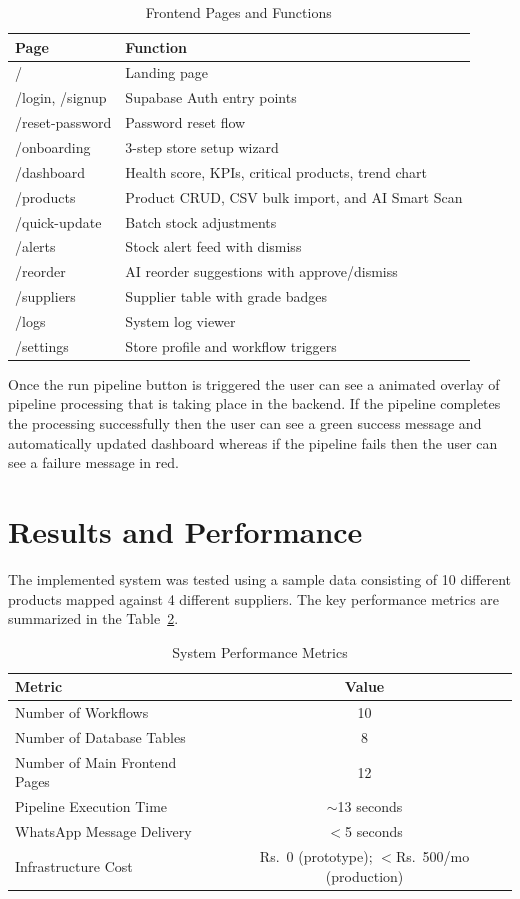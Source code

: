 \documentclass[journal]{IEEEtran}
\begin{document}
\begin{table}[htbp]
\centering
\caption{Frontend Pages and Functions}
\label{tab:routes}
\begin{tabular}{p{2.2cm}p{5.5cm}}
\toprule
\textbf{Page} & \textbf{Function} \\
\midrule
/ & Landing page \\
/login, /signup & Supabase Auth entry points \\
/reset-password & Password reset flow \\
/onboarding & 3-step store setup wizard \\
/dashboard & Health score, KPIs, critical products, trend chart \\
/products & Product CRUD, CSV bulk import, and AI Smart Scan \\
/quick-update & Batch stock adjustments \\
/alerts & Stock alert feed with dismiss \\
/reorder & AI reorder suggestions with approve/dismiss \\
/suppliers & Supplier table with grade badges \\
/logs & System log viewer \\
/settings & Store profile and workflow triggers \\
\bottomrule
\end{tabular}
\end{table}

Once the run pipeline button is triggered the user can see a animated overlay of pipeline processing that is taking place in the backend. If the pipeline completes the processing successfully then the user can see a green success message and automatically updated dashboard whereas if the pipeline fails then the user can see a failure message in red.

\section{Results and Performance}


The implemented system was tested using a sample data consisting of 10 different products mapped against 4 different suppliers. The key performance metrics are summarized in the Table~\ref{tab:perf}.

\begin{table}[htbp]
\centering
\caption{System Performance Metrics}
\label{tab:perf}
\begin{tabular}{lc}
\toprule
\textbf{Metric} & \textbf{Value} \\
\midrule
Number of Workflows & 10 \\
Number of Database Tables & 8 \\
Number of Main Frontend Pages & 12 \\
Pipeline Execution Time & $\sim$13 seconds \\
WhatsApp Message Delivery & $<$5 seconds \\
Infrastructure Cost & Rs.\ 0 (prototype); $<$Rs.\ 500/mo (production) \\
\bottomrule
\end{tabular}
\end{table}
\end{document}
